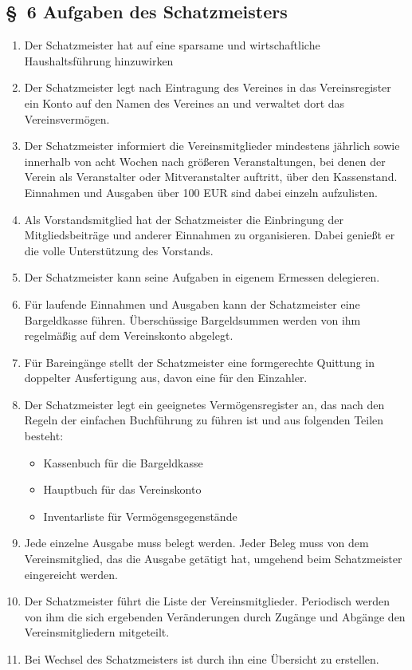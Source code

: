 \documentclass[10pt,a4paper]{scrartcl}
\begin{document}
\subsection*{\S \ 6 Aufgaben des Schatzmeisters}
\begin{enumerate}
\item Der Schatzmeister hat auf eine sparsame und wirtschaftliche
	Haushaltsf{\"u}hrung hinzuwirken
\item Der Schatzmeister legt nach Eintragung des Vereines in das Vereinsregister
	ein Konto auf den Namen des Vereines an und verwaltet dort das
	Vereinsverm{\"o}gen.
\item Der Schatzmeister informiert die Vereinsmitglieder mindestens
    j{\"a}hrlich sowie innerhalb von acht Wochen nach gr{\"o}{\ss}eren
	Veranstaltungen, bei denen der Verein als Veranstalter oder
	Mitveranstalter auftritt, {\"u}ber den Kassenstand. Einnahmen und
	Ausgaben {\"u}ber 100 EUR sind dabei einzeln aufzulisten.
\item Als Vorstandsmitglied hat der Schatzmeister die Einbringung der
	Mitgliedsbeitr{\"a}ge und anderer Einnahmen zu organisieren. Dabei
	genie{\ss}t er die volle Unterst{\"u}tzung des Vorstands.
\item Der Schatzmeister kann seine Aufgaben in eigenem Ermessen delegieren.
\item F{\"u}r laufende Einnahmen und Ausgaben kann der Schatzmeister eine
    Bargeldkasse f{\"u}hren. {\"U}ber\-sch{\"u}s\-sige Bargeldsummen werden von ihm
	regelm{\"a}{\ss}ig auf dem Vereinskonto abgelegt.
\item F{\"u}r Bareing{\"a}nge stellt der Schatzmeister eine formgerechte Quittung
	in doppelter Ausfertigung aus, davon eine f{\"u}r den Einzahler.
\item Der Schatzmeister legt ein geeignetes Verm{\"o}gensregister an, das
	nach den Regeln der einfachen Buchf{\"u}hrung zu f{\"u}hren ist und aus
	folgenden Teilen besteht:
	\begin{itemize}
	\item Kassenbuch f{\"u}r die Bargeldkasse
	\item Hauptbuch f{\"u}r das Vereinskonto
	\item Inventarliste f{\"u}r Verm{\"o}gensgegenst{\"a}nde 
	\end{itemize}
\item Jede einzelne Ausgabe muss belegt werden. Jeder Beleg muss von
	dem Vereinsmitglied, das die Ausgabe get{\"a}tigt hat, umgehend
	beim Schatzmeister eingereicht werden.
\item Der Schatzmeister f{\"u}hrt die Liste der Vereinsmitglieder.
	Periodisch werden von ihm die sich ergebenden Ver{\"a}nderungen
	durch Zug{\"a}nge und Abg{\"a}nge den Vereinsmitgliedern mitgeteilt.
\item Bei Wechsel des Schatzmeisters ist durch ihn eine {\"U}bersicht zu erstellen.
\end{enumerate}
%
%
\end{document}
